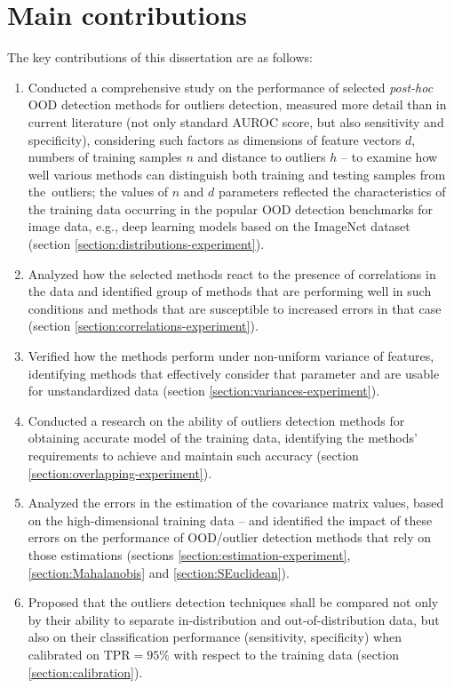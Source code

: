 \section{Main contributions}
\label{section:contributions}

The key contributions of this dissertation are as follows:
\vspace{-0.5\baselineskip}
\begin{enumerate}
    \item Conducted a comprehensive study on the performance of selected \textit{post-hoc} OOD detection methods for outliers detection, measured more detail than in current literature (not only standard AUROC score, but also sensitivity and specificity), considering such factors as dimensions of feature vectors $d$, numbers of training samples $n$ and distance to outliers $h$ – to examine how well various methods can distinguish both training and testing samples from the~outliers; the values of $n$ and $d$ parameters reflected the characteristics of the training data occurring in the popular OOD detection benchmarks for image data, e.g., deep learning models based on the ImageNet dataset (section \ref{section:distributions-experiment}).
    \item Analyzed how the selected methods react to the presence of correlations in the data and identified group of methods that are performing well in such conditions and methods that are susceptible to increased errors in that case (section \ref{section:correlations-experiment}).
    \item Verified how the methods perform under non-uniform variance of features, identifying methods that effectively consider that parameter and are usable for unstandardized data (section \ref{section:variances-experiment}).
    \item Conducted a research on the ability of outliers detection methods for obtaining accurate model of the training data, identifying the methods' requirements to achieve and maintain such accuracy (section \ref{section:overlapping-experiment}).
    \item Analyzed the errors in the estimation of the covariance matrix values, based on the high-dimensional training data – and identified the impact of these errors on the performance of OOD/outlier detection methods that rely on those estimations (sections \ref{section:estimation-experiment}, \ref{section:Mahalanobis} and \ref{section:SEuclidean}).
    \item Proposed that the outliers detection techniques shall be compared not only by their ability to separate in-distribution and out-of-distribution data, but also on their classification performance (sensitivity, specificity) when calibrated on $\text{TPR} = 95\%$ with respect to the training data (section \ref{section:calibration}).

\end{enumerate}
